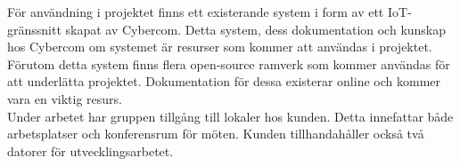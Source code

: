 För användning i projektet finns ett existerande system i form av ett IoT-gränssnitt skapat av Cybercom. Detta system, dess dokumentation och kunskap hos Cybercom om systemet är resurser som kommer att användas i projektet. Förutom detta system finns flera open-source ramverk som kommer användas för att underlätta projektet. Dokumentation för dessa existerar online och kommer vara en viktig resurs.\\

Under arbetet har gruppen tillgång till lokaler hos kunden. Detta innefattar både arbetsplatser och konferensrum för möten. Kunden tillhandahåller också två datorer för utvecklingsarbetet. \\

\pagebreak
